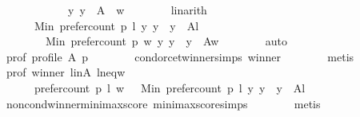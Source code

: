\begin{isabellebody}
\ \ \ \ \ \ \ \ \ \ \ \ y{\isachardot}{\kern0pt}\ y\ {\isasymin}\ A\ {\isacharminus}{\kern0pt}\ {\isacharbraceleft}{\kern0pt}w{\isacharbraceright}{\kern0pt}{\isacharbraceright}{\kern0pt}{\isachardoublequoteclose}\isanewline
\ \ \ \ \ \ \isamarkupfalse%
\ linarith\isanewline
\ \ \ \ \isamarkupfalse%
\ {}{}{}{\isacharcolon}{\kern0pt}\isanewline
\ \ \ \ \ \ {\isachardoublequoteopen}Min\ {\isacharbraceleft}{\kern0pt}prefer{\isacharunderscore}{\kern0pt}count\ p\ l\ y\ {\isacharbar}{\kern0pt}y\ {\isachardot}{\kern0pt}\ y\ {\isasymin}\ A{\isacharminus}{\kern0pt}{\isacharbraceleft}{\kern0pt}l{\isacharbraceright}{\kern0pt}{\isacharbraceright}{\kern0pt}\ {\isasymge}\isanewline
\ \ \ \ \ \ \ \ Min\ {\isacharbraceleft}{\kern0pt}prefer{\isacharunderscore}{\kern0pt}count\ p\ w\ y\ {\isacharbar}{\kern0pt}y\ {\isachardot}{\kern0pt}\ y\ {\isasymin}\ A{\isacharminus}{\kern0pt}{\isacharbraceleft}{\kern0pt}w{\isacharbraceright}{\kern0pt}{\isacharbraceright}{\kern0pt}{\isachardoublequoteclose}\isanewline
\ \ \ \ \ \ \isamarkupfalse%
\ auto\isanewline
\ \ \ \ \isamarkupfalse%
\ prof{\isacharcolon}{\kern0pt}\ {\isachardoublequoteopen}profile\ A\ p{\isachardoublequoteclose}\isanewline
\ \ \ \ \ \ \isamarkupfalse%
\ condorcet{\isacharunderscore}{\kern0pt}winner{\isachardot}{\kern0pt}simps\ winner\isanewline
\ \ \ \ \ \ \isamarkupfalse%
\ metis\isanewline
\ \ \ \ \isamarkupfalse%
\ prof\ winner\ l{\isacharunderscore}{\kern0pt}in{\isacharunderscore}{\kern0pt}A\ l{\isacharunderscore}{\kern0pt}neq{\isacharunderscore}{\kern0pt}w\isanewline
\ \ \ \ \isamarkupfalse%
\ {}{}{}{\isacharcolon}{\kern0pt}\isanewline
\ \ \ \ \ \ {\isachardoublequoteopen}prefer{\isacharunderscore}{\kern0pt}count\ p\ l\ w\ \ {\isasymge}\ Min\ {\isacharbraceleft}{\kern0pt}prefer{\isacharunderscore}{\kern0pt}count\ p\ l\ y\ {\isacharbar}{\kern0pt}y\ {\isachardot}{\kern0pt}\ y\ {\isasymin}\ A{\isacharminus}{\kern0pt}{\isacharbraceleft}{\kern0pt}l{\isacharbraceright}{\kern0pt}{\isacharbraceright}{\kern0pt}{\isachardoublequoteclose}\isanewline
\ \ \ \ \ \ \isamarkupfalse%
\ non{\isacharunderscore}{\kern0pt}cond{\isacharunderscore}{\kern0pt}winner{\isacharunderscore}{\kern0pt}minimax{\isacharunderscore}{\kern0pt}score\ minimax{\isacharunderscore}{\kern0pt}score{\isachardot}{\kern0pt}simps\isanewline
\ \ \ \ \ \ \isamarkupfalse%
\ metis\isanewline
\isanewline
\ \ \ \ \isamarkupfalse%

\end{isabellebody}

